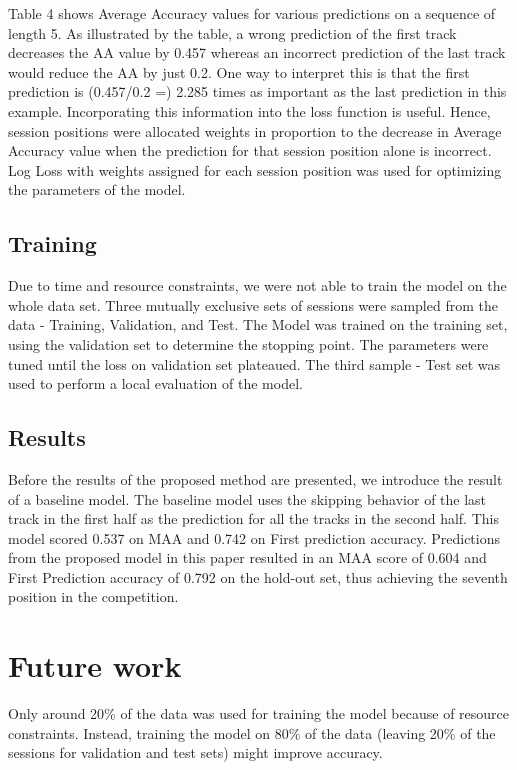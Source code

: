 \documentclass[sigconf]{acmart}
\begin{document}
Table 4 shows Average Accuracy values for various predictions on a sequence of length 5. As illustrated by the table, a wrong prediction of the first track decreases the AA value by 0.457 whereas an incorrect prediction of the last track would reduce the AA by just 0.2. One way to interpret this is that the first prediction is (0.457/0.2 =) 2.285 times as important as the last prediction in this example. Incorporating this information into the loss function is useful. Hence, session positions were allocated weights in proportion to the decrease in Average Accuracy value when the prediction for that session position alone is incorrect. Log Loss with weights assigned for each session position was used for optimizing the parameters of the model.

\subsection{Training}
Due to time and resource constraints, we were not able to train the model on the whole data set. Three mutually exclusive sets of sessions were sampled from the data - Training, Validation, and Test. The Model was trained on the training set, using the validation set to determine the stopping point. The parameters were tuned until the loss on validation set plateaued. The third sample - Test set was used to perform a local evaluation of the model.

\subsection{Results}
Before the results of the proposed method are presented, we introduce the result of a baseline model. The baseline model uses the skipping behavior of the last track in the first half as the prediction for all the tracks in the second half. This model scored 0.537 on MAA and 0.742 on First prediction accuracy. Predictions from the proposed model in this paper resulted in an MAA score of 0.604 and First Prediction accuracy of 0.792 on the hold-out set, thus achieving the seventh position in the competition.

\section{Future work}
Only around 20\% of the data was used for training the model because of resource constraints. Instead, training the model on 80\% of the data (leaving 20\% of the sessions for validation and test sets) might improve accuracy. 
\end{document}
